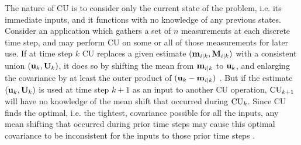 The nature of CU is to consider only the current state of the problem, i.e. its immediate inputs, and it functions with
no knowledge of any previous states. Consider an application which gathers a set of $n$ measurements at each discrete
time step, and may perform CU on some or all of those measurements for later use. If at time step $k$ CU replaces a
given estimate $(\mathbf{m}_{i|k},\mathbf{M}_{i|k})$ with a consistent union $(\mathbf{u}_{k},\mathbf{U}_{k})$, it does so by shifting the
mean from $\mathbf{m}_{i|k}$ to $\mathbf{u}_{k}$, and enlarging the covariance by at least the outer product of
$(\mathbf{u}_{k}-\mathbf{m}_{i|k})$ \cite{uhlmann03}. But if the estimate $(\mathbf{u}_{k},\mathbf{U}_{k})$ is used at time step $k+1$ as an
input to another CU operation, $\operatorname{CU}_{k+1}$ will have no knowledge of the mean shift that occurred during $\operatorname{CU}_{k}$. Since
CU finds the optimal, i.e. the tightest, covariance possible for all the inputs, any mean shifting that occurred during
prior time steps may cause this optimal covariance to be inconsistent for the inputs to those prior time steps
\cite{fusion06}.


